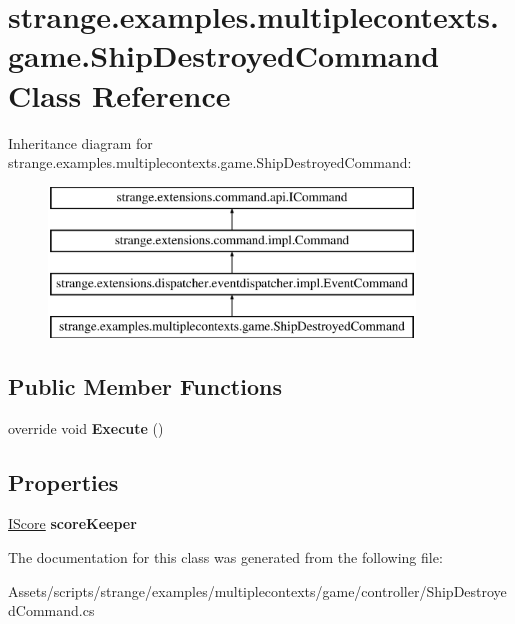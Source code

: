 \hypertarget{classstrange_1_1examples_1_1multiplecontexts_1_1game_1_1_ship_destroyed_command}{\section{strange.\-examples.\-multiplecontexts.\-game.\-Ship\-Destroyed\-Command Class Reference}
\label{classstrange_1_1examples_1_1multiplecontexts_1_1game_1_1_ship_destroyed_command}
}
Inheritance diagram for strange.\-examples.\-multiplecontexts.\-game.\-Ship\-Destroyed\-Command\-:\begin{figure}[H]
\begin{center}
\leavevmode
\includegraphics[height=4.000000cm]{classstrange_1_1examples_1_1multiplecontexts_1_1game_1_1_ship_destroyed_command}
\end{center}
\end{figure}
\subsection*{Public Member Functions}
\begin{DoxyCompactItemize}
\item 
\hypertarget{classstrange_1_1examples_1_1multiplecontexts_1_1game_1_1_ship_destroyed_command_a5579790dd2c029530c7ff141fd281197}{override void {\bfseries Execute} ()}\label{classstrange_1_1examples_1_1multiplecontexts_1_1game_1_1_ship_destroyed_command_a5579790dd2c029530c7ff141fd281197}

\end{DoxyCompactItemize}
\subsection*{Properties}
\begin{DoxyCompactItemize}
\item 
\hypertarget{classstrange_1_1examples_1_1multiplecontexts_1_1game_1_1_ship_destroyed_command_a5abfa06106b81005da737cf4400f8320}{\hyperlink{interfacestrange_1_1examples_1_1multiplecontexts_1_1game_1_1_i_score}{I\-Score} {\bfseries score\-Keeper}}\label{classstrange_1_1examples_1_1multiplecontexts_1_1game_1_1_ship_destroyed_command_a5abfa06106b81005da737cf4400f8320}

\end{DoxyCompactItemize}


The documentation for this class was generated from the following file\-:\begin{DoxyCompactItemize}
\item 
Assets/scripts/strange/examples/multiplecontexts/game/controller/Ship\-Destroyed\-Command.\-cs\end{DoxyCompactItemize}
